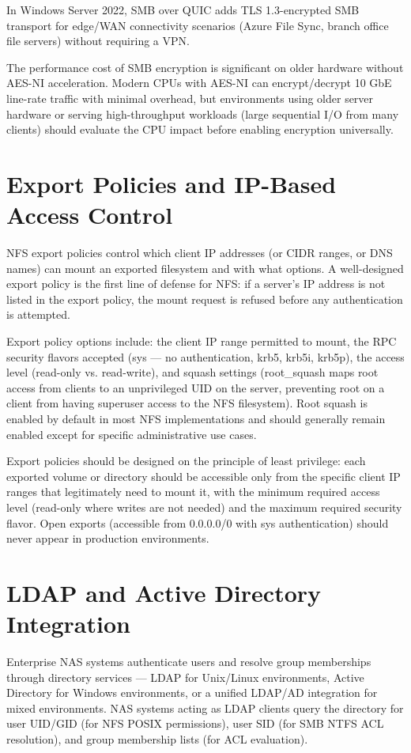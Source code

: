 In Windows Server 2022, SMB over QUIC adds TLS 1.3-encrypted SMB transport for edge/WAN connectivity scenarios (Azure File Sync, branch office file servers) without requiring a VPN.

The performance cost of SMB encryption is significant on older hardware without AES-NI acceleration. Modern CPUs with AES-NI can encrypt/decrypt 10 GbE line-rate traffic with minimal overhead, but environments using older server hardware or serving high-throughput workloads (large sequential I/O from many clients) should evaluate the CPU impact before enabling encryption universally.

\section{Export Policies and IP-Based Access Control}
NFS export policies control which client IP addresses (or CIDR ranges, or DNS names) can mount an exported filesystem and with what options. A well-designed export policy is the first line of defense for NFS: if a server's IP address is not listed in the export policy, the mount request is refused before any authentication is attempted.

Export policy options include: the client IP range permitted to mount, the RPC security flavors accepted (sys --- no authentication, krb5, krb5i, krb5p), the access level (read-only vs. read-write), and squash settings (root\_squash maps root access from clients to an unprivileged UID on the server, preventing root on a client from having superuser access to the NFS filesystem). Root squash is enabled by default in most NFS implementations and should generally remain enabled except for specific administrative use cases.

Export policies should be designed on the principle of least privilege: each exported volume or directory should be accessible only from the specific client IP ranges that legitimately need to mount it, with the minimum required access level (read-only where writes are not needed) and the maximum required security flavor. Open exports (accessible from 0.0.0.0/0 with sys authentication) should never appear in production environments.

\section{LDAP and Active Directory Integration}
Enterprise NAS systems authenticate users and resolve group memberships through directory services --- LDAP for Unix/Linux environments, Active Directory for Windows environments, or a unified LDAP/AD integration for mixed environments. NAS systems acting as LDAP clients query the directory for user UID/GID (for NFS POSIX permissions), user SID (for SMB NTFS ACL resolution), and group membership lists (for ACL evaluation).

